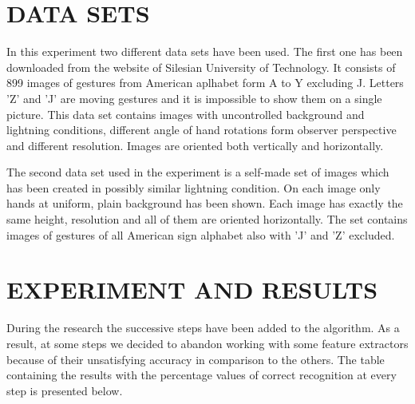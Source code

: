 \documentclass[11pt,a4paper]{article}
\begin{document}
\section{DATA SETS}

	In this experiment two different data sets have been used. The first one has been downloaded from the website of Silesian University of Technology. It consists of 899 images of gestures from American aplhabet form A to Y excluding J. Letters 'Z' and 'J' are moving gestures and it is impossible to show them on a single picture. This data set contains images with uncontrolled background and lightning conditions, different angle of hand rotations form observer perspective and different resolution. Images are oriented both vertically and horizontally.
	
	The second data set used in the experiment is a self-made set of images which has been created in possibly similar lightning condition. On each image only hands at uniform, plain background has been shown. Each image has exactly the same height, resolution and all of them are oriented horizontally. The set contains images of gestures of all American sign alphabet also with 'J' and 'Z' excluded.



\section{EXPERIMENT AND RESULTS}

During the research the successive steps have been added to the algorithm. As a result, at some steps we decided to abandon working with some feature extractors because of their unsatisfying accuracy in comparison to the others. The table containing the results with the percentage values of correct recognition at every step is presented below.
\end{document}
